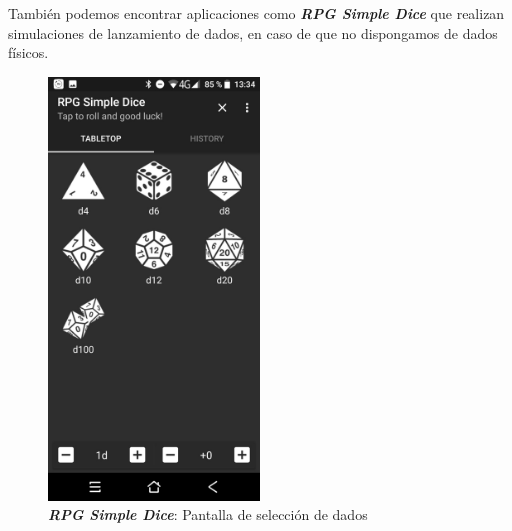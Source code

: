 También podemos encontrar aplicaciones como \textit{\textbf{RPG Simple Dice}} 
que realizan simulaciones de lanzamiento de dados, en caso de que no 
dispongamos de dados físicos. \bigskip

\begin{figure}[H]
    \centering
    \begin{minipage}{0.35\textwidth}
        \centering
        \includegraphics[width=0.5\textwidth]{Images/RPG_Simple_Dice_1.jpeg}
        \caption{\textit{\textbf{RPG Simple Dice}}: Pantalla de selección 
        de dados}
        

\end{minipage}
\end{figure}
